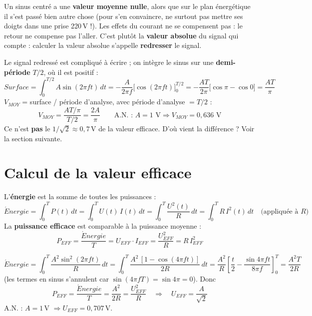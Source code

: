 
Un sinus centré a une \textbf{valeur moyenne nulle}, alors que sur le plan énergétique il
s'est passé bien autre chose (pour s'en convaincre, ne surtout pas mettre ses doigts dans une
prise 220\,V !). Les effets du courant ne se compensent pas : \og le retour ne compense pas
l'aller\fg{}. C'est plutôt la \textbf{valeur absolue} du signal qui compte : calculer la
valeur absolue s'appelle \textbf{redresser} le signal.


\begin{exbox}[title={Valeur moyenne d'un sinus redressé, $V(t) = A\sin(\omega t)$}]
Le signal redressé est compliqué à écrire ; on intègre le sinus sur une
\textbf{demi-période} $T/2$, où il est positif :
\[ Surface = \int_0^{T/2} A\sin(2\pi f t)\,dt
   = -\frac{A}{2\pi f}\Big[\cos(2\pi f t)\Big]_0^{T/2}
   = -\frac{AT}{2\pi}\big[\cos\pi - \cos 0\big] = \frac{AT}{\pi} \]
$V_{MOY}$ = surface / période d'analyse, avec période d'analyse $= T/2$ :
\[ \boxed{V_{MOY} = \frac{AT/\pi}{T/2} = \frac{2A}{\pi}} \qquad
   \text{A.N. : } A = 1\text{ V} \Rightarrow V_{MOY} = 0{,}636\text{ V} \]
Ce n'est \textbf{pas} le $1/\sqrt2 \approx 0{,}7$\,V de la valeur efficace. D'où vient la
différence ? Voir la section suivante.
\end{exbox}

\section{Calcul de la valeur efficace}


\begin{thmbox}[title=Valeur efficace (liée à la puissance)]
L'\textbf{énergie} est la somme de toutes les puissances :
\[ \acute{E}nergie = \int_0^T P(t)\,dt = \int_0^T U(t)\,I(t)\,dt
   = \int_0^T \frac{U^2(t)}{R}\,dt = \int_0^T R\,I^2(t)\,dt \quad\text{(appliquée à $R$)} \]
La \textbf{puissance efficace} est comparable à la puissance moyenne :
\[ P_{EFF} = \frac{\acute{E}nergie}{T} = U_{EFF}\cdot I_{EFF} = \frac{U_{EFF}^2}{R} = R\,I_{EFF}^2 \]
\end{thmbox}

\begin{exbox}[title={Calcul pour $U(t) = A\sin(2\pi f t)$ sur une résistance}]
\[ \acute{E}nergie = \int_0^T \frac{A^2\sin^2(2\pi f t)}{R}\,dt
   = \int_0^T \frac{A^2\,[1-\cos(4\pi f t)]}{2R}\,dt
   = \frac{A^2}{R}\left[\frac t2 - \frac{\sin 4\pi f t}{8\pi f}\right]_0^T
   = \frac{A^2 T}{2R} \]
(les termes en sinus s'annulent car $\sin(4\pi fT) = \sin 4\pi = 0$). Donc
\[ \boxed{P_{EFF} = \frac{\acute{E}nergie}{T} = \frac{A^2}{2R} = \frac{U_{EFF}^2}{R}
   \quad\Longrightarrow\quad U_{EFF} = \frac{A}{\sqrt2}} \]
A.N. : $A = 1$\,V $\Rightarrow U_{EFF} = 0{,}707$\,V.
\end{exbox}

